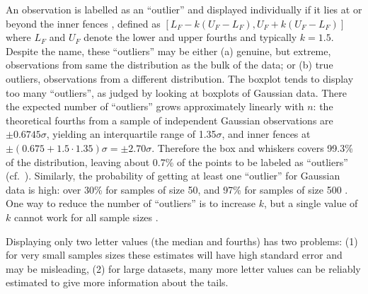 \documentclass[oneside]{article}
\begin{document}
An observation is labelled as an ``outlier'' and displayed individually if it lies at or beyond the inner fences \citep{eda,emerson83}, defined as $[L_F - k(U_F - L_F), U_F + k(U_F - L_F)]$ where $L_F$ and $U_F$ denote the lower and upper fourths and typically $k = 1.5$. Despite the name, these ``outliers'' may be either (a) genuine, but extreme, observations from same the distribution as the bulk of the data; or (b) true outliers, observations from a different distribution. The boxplot tends to display too many ``outliers'', as judged by looking at boxplots of Gaussian data. There the expected number of ``outliers'' grows approximately linearly with $n$: the theoretical fourths from a sample of independent Gaussian observations are $\pm 0.6745\sigma$, yielding an interquartile range of 1.35$\sigma$, and inner fences at $\pm (0.675 + 1.5 \cdot 1.35)\sigma = \pm 2.70\sigma$. Therefore the box and whiskers covers 99.3\% of the distribution, leaving about 0.7\% of the points to be labeled as ``outliers'' (cf.~\citet{dchlv}). Similarly, the probability of getting at least one ``outlier'' for Gaussian data is high: over 30\% for samples of size 50, and 97\% for samples of size 500 \citep[pg. 1148]{dchbox}. One way to reduce the number of ``outliers'' is to increase $k$, but a single value of $k$ cannot work for all sample sizes \citep[pg. 1148]{dchbox}.

Displaying only two letter values (the median and fourths) has two problems: (1) for very small samples sizes these estimates will have high standard error and may be misleading, (2) for large datasets, many more letter values can be reliably estimated to give more information about the tails. 

\end{document}
